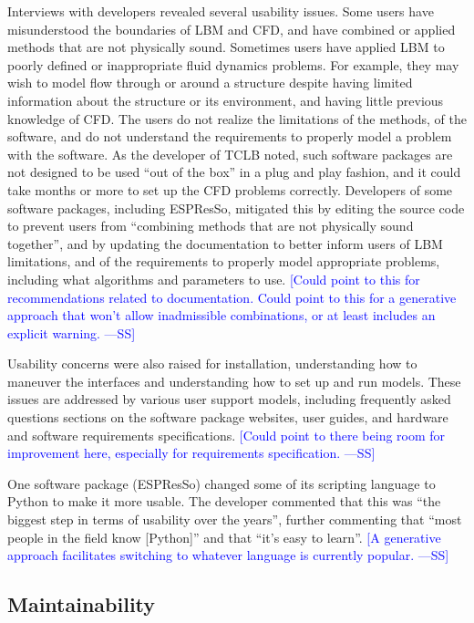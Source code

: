 \documentclass[final, 3p, times, authoryear]{elsarticle}
\newcommand{\authornote}[3]{\textcolor{#1}{[#3 ---#2]}}
\newcommand{\authornote}[3]{}
\newcommand{\wss}[1]{\authornote{blue}{SS}{#1}} %
\begin{document}
Interviews with developers revealed several usability issues. Some users have
misunderstood the boundaries of LBM and CFD, and have combined or applied
methods that are not physically sound. Sometimes users have applied LBM to
poorly defined or inappropriate fluid dynamics problems. For example, they may
wish to model flow through or around a structure despite having limited
information about the structure or its environment, and having little previous
knowledge of CFD. The users do not realize the limitations of the methods, of
the software, and do not understand the requirements to properly model a problem
with the software. As the developer of TCLB noted, such software packages are
not designed to be used ``out of the box'' in a plug and play fashion, and it
could take months or more to set up the CFD problems correctly. Developers of
some software packages, including ESPResSo, mitigated this by editing the source
code to prevent users from ``combining methods that are not physically sound
together'', and by updating the documentation to better inform users of LBM
limitations, and of the requirements to properly model appropriate problems,
including what algorithms and parameters to use.  \wss{Could point to this for
recommendations related to documentation.  Could point to this for a generative
approach that won't allow inadmissible combinations, or at least includes an
explicit warning.}

Usability concerns were also raised for installation, understanding how to
maneuver the interfaces and understanding how to set up and run models. These
issues are addressed by various user support models, including frequently asked
questions sections on the software package websites, user guides, and hardware
and software requirements specifications.  \wss{Could point to there being room
for improvement here, especially for requirements specification.}

One software package (ESPResSo) changed some of its scripting language to Python
to make it more usable. The developer commented that this was ``the biggest step
in terms of usability over the years'', further commenting that ``most people in
the field know [Python]'' and that ``it's easy to learn''.  \wss{A generative
approach facilitates switching to whatever language is currently popular.}

\subsection{Maintainability}
\end{document}
